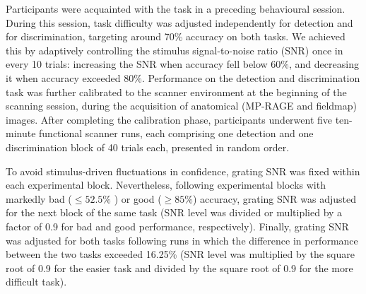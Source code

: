 \documentclass[12pt,twoside]{reedthesis}
\begin{document}
Participants were acquainted with the task in a preceding behavioural session. During this session, task difficulty was adjusted independently for detection and for discrimination, targeting around 70\% accuracy on both tasks. We achieved this by adaptively controlling the stimulus signal-to-noise ratio (SNR) once in every 10 trials: increasing the SNR when accuracy fell below 60\%, and decreasing it when accuracy exceeded 80\%. Performance on the detection and discrimination task was further calibrated to the scanner environment at the beginning of the scanning session, during the acquisition of anatomical (MP-RAGE and fieldmap) images. After completing the calibration phase, participants underwent five ten-minute functional scanner runs, each comprising one detection and one discrimination block of 40 trials each, presented in random order.

To avoid stimulus-driven fluctuations in confidence, grating SNR was fixed within each experimental block. Nevertheless, following experimental blocks with markedly bad (\(\leq52.5\%\) ) or good (\(\geq85\%\)) accuracy, grating SNR was adjusted for the next block of the same task (SNR level was divided or multiplied by a factor of 0.9 for bad and good performance, respectively). Finally, grating SNR was adjusted for both tasks following runs in which the difference in performance between the two tasks exceeded 16.25\% (SNR level was multiplied by the square root of 0.9 for the easier task and divided by the square root of 0.9 for the more difficult task).
\end{document}
